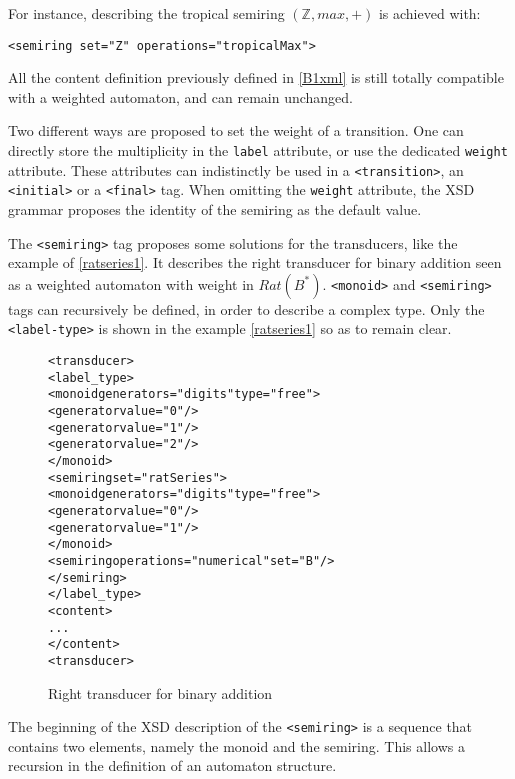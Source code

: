 \documentclass[a4paper]{article}
\newcommand{\xtag}[1]{\texttt{<#1>}}
\def\typetag{\xtag{label-type}}
\def\transitiontag{\xtag{transition}}
\def\finaltag{\xtag{final}}
\def\initialtag{\xtag{initial}}
\def\monoidtag{\xtag{monoid}}
\def\semiringtag{\xtag{semiring}}
\begin{document}
For instance, describing the tropical semiring $({\mathbb Z}, max, +)$
is achieved with:
\begin{center}
{\small
\verb|<semiring set="Z" operations="tropicalMax">|}
\end{center}

All the content definition previously defined in \autoref{B1xml} is
still totally compatible with a weighted automaton, and can remain
unchanged.

Two different ways are proposed to set the weight of a transition. One
can directly store the multiplicity in the \verb|label| attribute, or
use the dedicated \verb|weight| attribute. These attributes can
indistinctly be used in a \transitiontag{}, an \initialtag{} or a
\finaltag{} tag. When omitting the \verb|weight| attribute, the XSD
grammar proposes the identity of the semiring as the default value.

\medskip

The \semiringtag{} tag proposes some solutions for the transducers,
like the example of \autoref{ratseries1}. It describes the right
transducer for binary addition seen as a weighted automaton with
weight in $Rat(B^*)$. \monoidtag{} and \semiringtag{} tags can
recursively be defined, in order to describe a complex type. Only the
\typetag{} is shown in the example \autoref{ratseries1} so as to
remain clear.

\begin{figure}[ht]
  \begin{center}
\begin{alltt}
<transducer>
  <label_type>
    <monoid generators="digits" type="free">
      <generator value="0"/>
      <generator value="1"/>
      <generator value="2"/>
    </monoid>
    <semiring set="ratSeries">
      <monoid generators="digits" type="free">
        <generator value="0"/>
        <generator value="1"/>
      </monoid>
      <semiring operations="numerical" set="B"/>
    </semiring>
  </label_type>
  <content>
    ...
  </content>
<transducer>
\end{alltt}

\caption{Right transducer for binary addition}
\label{ratseries1}
  \end{center}
\end{figure}

The beginning of the XSD description of the \semiringtag{} is a sequence that
contains two elements, namely the monoid and the semiring. This allows a
recursion in the definition of an automaton structure.
\end{document}
